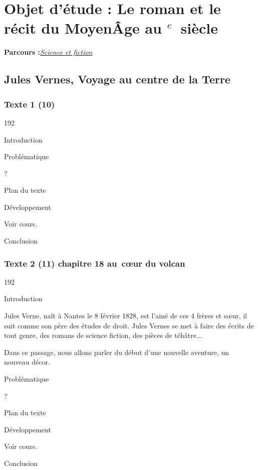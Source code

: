 \documentclass[12pt,a4paper]{article}
\begin{document}
		\section[Sciences et fiction]{Objet d'\'etude : Le roman et le r\'ecit du Moyen\^Age au \textsc{}$^{e}$~siècle}
		\textbf{Parcours :}\textit{\underline{Science et fiction}}
			\subsection{Jules Vernes, Voyage au centre de la Terre}
				\subsubsection{Texte 1 (10)}
\begin{dingautolist}{192}

\item Introduction \par
\item Probl\'ematique \par
	\textcolor{blue}{?}
\item Plan du texte \par
\item D\'eveloppement \par
        Voir cours.

\item Conclusion \par

\end{dingautolist}

				\subsubsection{Texte 2 (11) chapitre 18 au~c\oe ur du volcan}
\begin{dingautolist}{192}

\item Introduction \par
Jules Verne, naît à Nantes le 8 février 1828, est l'ainé de ces 4 frères et s\oe ur, il suit comme son père des études de droit. Jules Vernes se met à faire des écrits de tout genre, des romans de science fiction, des pièces de téhâtre...\par
Dans ce passage, nous allons parler du début d'une nouvelle aventure, un nouveau décor. 


\item Probl\'ematique \par
	\textcolor{blue}{?}
\item Plan du texte \par
\item D\'eveloppement \par
        Voir cours.

\item Conclusion \par

\end{dingautolist}
\end{document}
